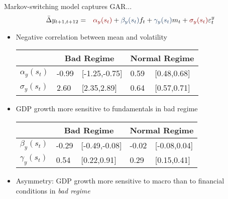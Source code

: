 \documentclass[xcolor=dvipsnames, xcolor=table, 10pt]{beamer}
\newcommand{\pb}[1]{{\color{fedblue}#1}}
\newcommand{\rr}[1]{{\color{darkred}#1}}
\newcommand*{\h}{\hspace{0.15cm}}
\begin{document}

\begin{frame}{Markov-switching model captures GAR...}
\vspace*{-0.25in}
\begin{eqnarray*}
\bar{\Delta} {y}_{t+1,t+12} &=& \rr{\alpha_y (s_t)} + \pb{\beta_y (s_t)} f_t + \pb{\gamma_y (s_t)} m_t + \rr{\sigma_y (s_t)} \varepsilon^y_t
\end{eqnarray*}
\begin{itemize}
\item \rr{Negative correlation between mean and volatility}
\bigskip
\small
\begin{table}[ht!]
  \centering
  \vspace{-0.25cm}
  \begin{tabular}{p{1.5cm} p{1cm} p{2cm} p{1cm} p{2cm}}
\hline
& \multicolumn{2}{c}{\textbf{Bad Regime}} & \multicolumn{2}{c}{\textbf{Normal Regime}} \\
    \hline
  $\alpha_y(s_t)$   & -0.99 & [-1.25,-0.75] & \h0.59 & [\h0.48,\h0.68]  \\
  $\sigma_y(s_t)$   & \h2.60 & [\h2.35,\h2.89] & \h0.64 & [\h0.57,\h0.71]  \\
  \midrule
    \midrule
    \end{tabular}%
\end{table}%

\item \pb{GDP growth more sensitive to fundamentals in bad regime}
\bigskip

\begin{table}[ht!]
  \centering
  \vspace{-0.25cm}
  \begin{tabular}{p{1.5cm} p{1cm} p{2cm} p{1cm} p{2cm}}
\hline
& \multicolumn{2}{c}{\textbf{Bad Regime}} & \multicolumn{2}{c}{\textbf{Normal Regime}} \\
    \hline
  $\beta_y(s_t)$    & -0.29 & [-0.49,-0.08] & -0.02 & [-0.08,\h0.04]  \\
  $\gamma_y(s_t)$   & \h0.54 & [\h0.22,\h0.91] & \h0.29 & [\h0.15,\h0.41]  \\
  \midrule
    \midrule
    \end{tabular}%
\end{table}%
\end{itemize}

\normalsize
\begin{itemize}
     \item Asymmetry: GDP growth more sensitive to macro than to financial conditions in  \textit{bad regime}
\end{itemize}

\end{frame}
\end{document}
